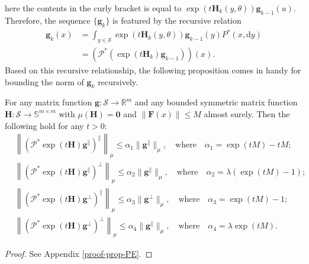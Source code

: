 here the contents in the curly bracket is equal to $\exp\left(t\bm{H}_k(y,\theta)\right)\bm{g}_{k-1}(u)$. Therefore, the sequence $\{\bm{g}_k\}$ is featured by the recursive relation
\begin{align}\label{eq:markov-matrix-hoeffding-G-recursive}
\bm{g}_{k}(x) &= \int_{y \in \mathcal{S}}\exp\left(t\bm{H}_k(y,\theta)\right)\bm{g}_{k-1}(y) P^*(x,\mathrm{d}y) \nonumber \\ 
&= (\mathcal{P}^* (\exp(t\bm{H}_k)\bm{g}_{k-1}))(x).
\end{align}
Based on this recursive relationship, the following proposition comes in handy for bounding the norm of $\bm{g}_k$ recursively.

\begin{customproposition}\label{prop:PE}
For any matrix function $\bm{g}: \mathcal{S} \to \mathbb{R}^{m}$ and any bounded symmetric matrix function $\bm{H}: \mathcal{S} \to \mathbb{S}^{m \times m}$ with  $\mu(\bm{H}) = \bm{0}$ and $\|\bm{F}(x)\| \leq M$ almost surely. Then the following hold for any $t > 0$:
\begin{align}
&\left\|\left(\mathcal{P}^* \exp(t\bm{H})\bm{g}^{\parallel}\right)^{\parallel}\right\|_{\mu} \leq \alpha_1 \|\bm{g}^{\parallel}\|_{\mu},\quad \text{where} \quad \alpha_1 = \exp(tM)-tM;\label{eq:PE1}\\
&\left\|\left(\mathcal{P}^* \exp(t\bm{H})\bm{g}^{\parallel}\right)^{\perp}\right\|_{\mu} \leq \alpha_2 \|\bm{g}^{\parallel}\|_{\mu},\quad \text{where} \quad \alpha_2 = \lambda(\exp(tM)-1);\label{eq:PE2}\\ 
&\left\|\left(\mathcal{P}^* \exp(t\bm{H})\bm{g}^{\perp}\right)^{\parallel}\right\|_{\mu} \leq \alpha_3 \|\bm{g}^{\perp}\|_{\mu},\quad \text{where} \quad \alpha_3 = \exp(tM)-1; \label{eq:PE3}\\ 
&\left\|\left(\mathcal{P}^* \exp(t\bm{H})\bm{g}^{\perp}\right)^{\perp}\right\|_{\mu} \leq \alpha_4 \|\bm{g}^{\parallel}\|_{\mu},\quad \text{where} \quad \alpha_4 = \lambda \exp(tM).\label{eq:PE4}
\end{align}
\end{customproposition}
\begin{proof} 
See Appendix \ref{proof-prop-PE}.
\end{proof}

